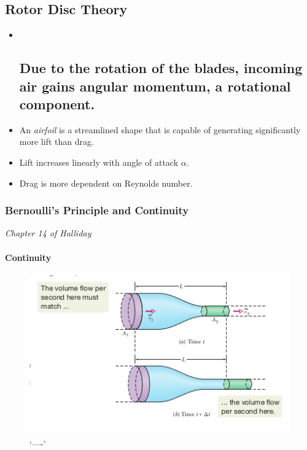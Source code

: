 \documentclass[11pt]{article}
\begin{document}
\hypertarget{rotor-disc-theory}{%
\subsection{Rotor Disc Theory}\label{rotor-disc-theory}}

\begin{itemize}
\item ~
  \hypertarget{due-to-the-rotation-of-the-blades-incoming-air-gains-angular-momentum-a-rotational-component.}{%
  \subsection{Due to the rotation of the blades, incoming air gains
  angular momentum, a rotational
  component.}\label{due-to-the-rotation-of-the-blades-incoming-air-gains-angular-momentum-a-rotational-component.}}
\item
  An \emph{airfoil} is a streamlined shape that is capable of generating
  significantly more lift than drag.
\item
  Lift increases linearly with angle of attack \(\alpha\).
\item
  Drag is more dependent on Reynolds number.
\end{itemize}

\hypertarget{bernoullis-principle-and-continuity}{%
\subsubsection{Bernoulli's Principle and
Continuity}\label{bernoullis-principle-and-continuity}}

\emph{Chapter 14 of Halliday}

\hypertarget{continuity}{%
\paragraph{Continuity}\label{continuity}}

\begin{figure}
\centering
\includegraphics{img/continuityhalliday.png}
\caption{`----'}
\end{figure}
\end{document}
